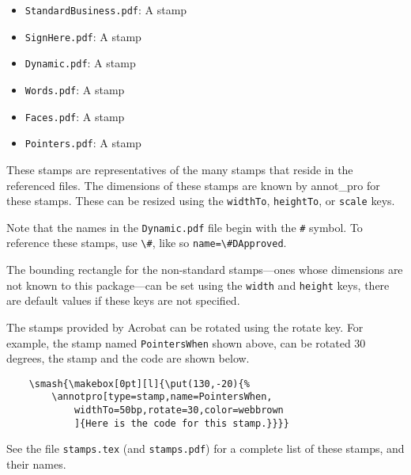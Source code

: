 \documentclass{article}
\begin{document}
\begin{itemize}
\item  \texttt{StandardBusiness.pdf}: A  stamp
\item  \texttt{SignHere.pdf}: A  stamp
\item  \texttt{Dynamic.pdf}: A  stamp
\item  \texttt{Words.pdf}: A  stamp
\item  \texttt{Faces.pdf}: A  stamp
\item  \texttt{Pointers.pdf}: A  stamp
\end{itemize}
These stamps are representatives of the many stamps that reside in the referenced files. The dimensions of these
stamps are known by \textsf{annot\_pro} for these stamps. These can be resized using the \texttt{widthTo}, \texttt{heightTo}, or \texttt{scale}
keys.

Note that the names in the \texttt{Dynamic.pdf} file begin with the \texttt{\#} symbol. To reference these stamps, use
\verb!\#!, like so \verb!name=\#DApproved!.

The bounding rectangle for the non-standard stamps---ones whose
dimensions are not known to this package---can be set using the
\texttt{width} and \texttt{height} keys, there are default values if
these keys are not specified. 

The stamps provided by Acrobat can be rotated using the rotate key. For example, the stamp named
\texttt{PointersWhen} shown above, can be rotated 30 degrees, the stamp and the code are shown below.
\begin{verbatim}
    \smash{\makebox[0pt][l]{\put(130,-20){%
        \annotpro[type=stamp,name=PointersWhen,
            widthTo=50bp,rotate=30,color=webbrown
            ]{Here is the code for this stamp.}}}}
\end{verbatim}
See the file \texttt{stamps.tex} (and \texttt{stamps.pdf}) for a
complete list of these stamps, and their names.
\end{document}
